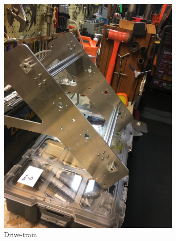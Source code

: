 \documentclass{article}
\begin{document}
\begin{figure}[h!]
\centering
\begin{subfigure}{.45\textwidth}
  \centering
  \includegraphics[width=\textwidth,angle=-90]{10_11-05/images/train.JPG}
  \caption{Drive-train}
  \label{fig:Drivetrain}
 \end{subfigure}
\begin{subfigure}{.45\textwidth}
  \centering

\end{subfigure}
\end{figure}
\end{document}
